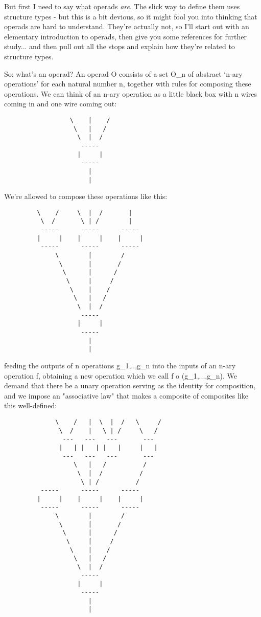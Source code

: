 But first I need to say what operads \emph{are}.  The slick way to define 
them uses structure types - but this is a bit devious, so it might
fool you into thinking that operads are hard to understand.  They're
actually not, so I'll start out with an elementary introduction to operads, 
then give you some references for further study... and then pull out all
the stops and explain how they're related to structure types.

So: what's an operad?  An operad O consists of a set O_{n} of abstract 
`n-ary operations' for each natural number n, together with rules for 
composing these operations.  We can think of an n-ary operation as a 
little black box with n wires coming in and one wire coming out:  

\begin{verbatim}
                  \    |    /
                   \   |   / 
                    \  |  /
                     -----
                    |     | 
                     -----
                       |
                       |
\end{verbatim}
    
We're allowed to compose these operations like this:

\begin{verbatim}
         \    /     \  |  /       | 
          \  /       \ | /        |
          -----      -----      -----
         |     |    |     |    |     |
          -----      -----      -----
              \        |        /  
               \       |       /
                \      |      /
                 \     |     /
                  \    |    / 
                   \   |   /  
                    \  |  /
                     -----
                    |     | 
                     -----
                       |
                       |
\end{verbatim}
    
feeding the outputs of n operations g_{1},..,g_{n} into
the inputs of an n-ary operation f, obtaining a new operation which we
call f o (g_{1},...,g_{n}).  We demand that there be a
unary operation serving as the identity for composition, and we impose
an "associative law" that makes a composite of composites like
this well-defined:


\begin{verbatim}
              \    /   |  \  |  /   \     / 
               \  /    |   \ | /     \   / 
                ---   ---   ---       ---
               |   | |   | |   |     |   |
                ---   ---   ---       ---
                   \   |   /          /
                    \  |  /          / 
                     \ | /          / 
          -----      -----      -----
         |     |    |     |    |     |
          -----      -----      -----
              \        |        /  
               \       |       /   
                \      |      /
                 \     |     / 
                  \    |    / 
                   \   |   /   
                    \  |  /
                     -----
                    |     | 
                     -----
                       |
                       |
\end{verbatim}
    
